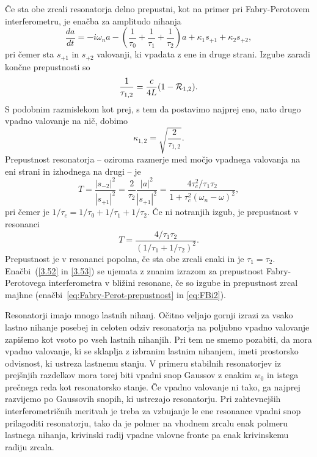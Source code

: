 Če sta obe zrcali resonatorja delno prepustni, kot na primer pri 
Fabry-Perotovem interferometru, je enačba za amplitudo nihanja 
\begin{equation}
\frac{da}{dt}=-i\omega_{n}a-\left(\frac{1}{\tau_{0}}+\frac{1}{\tau_{1}}+\frac{1}{\tau_{2}}\right)
a+\kappa_{1}s_{+1}+\kappa_{2}s_{+2},
\label{3.49}
\end{equation}
pri čemer sta $s_{+1}$ in $s_{+2}$ valovanji, ki vpadata z ene in druge strani.
Izgube zaradi končne prepustnosti so
\begin{equation}
\frac{1}{\tau_{1,2}}=\frac{c}{4L}(1-{\cal R}_{1,2}).\label{3.50}
\end{equation}
S podobnim razmislekom kot prej, s tem da postavimo najprej eno, nato drugo
vpadno valovanje na nič, dobimo 
\begin{equation}
\kappa_{1,2}=\sqrt{\frac{2}{\tau_{1,2}}}.
\label{3.51}
\end{equation}
Prepustnost resonatorja -- oziroma razmerje med močjo vpadnega valovanja
na eni strani in izhodnega na drugi -- je
\begin{equation}
T=\frac{|s_{-2}|^{2}}{|s_{+1}|^{2}}=\frac{2}{\tau_{2}}\frac{|a|^{2}}{|s_{+1}|^{2}}=\frac{4\tau_c^{2}/
\tau_{1}\tau_{2}}{1+\tau_c^{2}(\omega_{n}-\omega)^{2}},
\label{3.52}
\end{equation}
pri čemer je $1/\tau_c=1/\tau_{0}+1/\tau_{1}+1/\tau_{2}$. 
 Če ni notranjih izgub, je prepustnost v resonanci 
\begin{equation}
T=\frac{4/\tau_{1}\tau_{2}}{(1/\tau_{1}+1/\tau_{2})^{2}}.
\label{3.53}
\end{equation}
Prepustnost je v resonanci popolna, če sta obe zrcali enaki in je $\tau_{1}=\tau_{2}$.
Enačbi~(\ref{3.52} in \ref{3.53}) se ujemata z znanim izrazom 
za prepustnost Fabry-Perotovega interferometra v bližini resonanc,
če so izgube in prepustnost zrcal majhne (enačbi~\ref{eq:Fabry-Perot-prepustnost} 
in \ref{eq:FBi2}). 

Resonatorji imajo mnogo lastnih nihanj. Očitno veljajo gornji izrazi
za vsako lastno nihanje posebej in celoten odziv resonatorja na poljubno vpadno
valovanje zapišemo kot vsoto po vseh lastnih nihanjih. Pri tem ne smemo pozabiti,
da mora vpadno valovanje, ki se sklaplja z izbranim lastnim nihanjem,
imeti prostorsko odvisnost, ki ustreza lastnemu stanju. V primeru
stabilnih resonatorjev iz prejšnjih razdelkov mora torej biti vpadni
snop Gaussov z enakim $w_{0}$ in istega prečnega reda kot resonatorsko
stanje. Če vpadno valovanje ni tako, ga najprej razvijemo po
Gaussovih snopih, ki ustrezajo resonatorju.
Pri zahtevnejših interferometričnih meritvah je treba za vzbujanje le ene 
resonance vpadni snop prilagoditi resonatorju, tako da je polmer na vhodnem 
zrcalu enak polmeru lastnega nihanja, krivinski radij vpadne valovne fronte 
pa enak krivinskemu radiju zrcala. 

